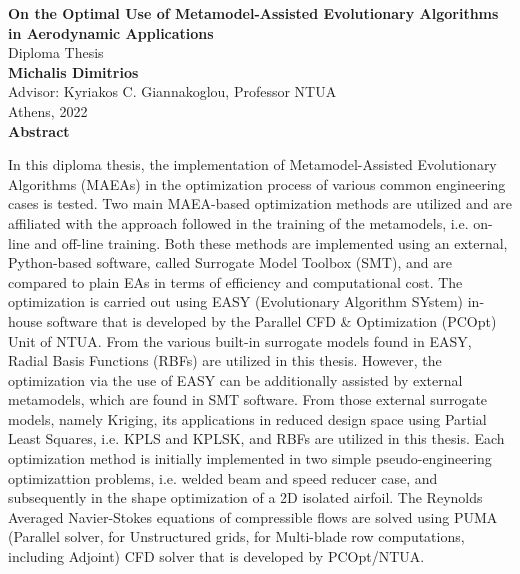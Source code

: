 \documentclass[twoside, 12pt,notitlepage]{report}
\begin{document}
\hspace{-2mm}
\begin{center}
\textbf{On the Optimal Use of Metamodel-Assisted 
Evolutionary Algorithms in Aerodynamic Applications} \\[2mm]
Diploma Thesis \\[1mm]
\textbf{Michalis Dimitrios} \\[3mm]
Advisor: Kyriakos C. Giannakoglou, Professor NTUA \\[1mm]
Athens, 2022 \\[6mm]
\large \textbf{Abstract} \\
\end{center}

\vspace{2mm}

In this diploma thesis, the implementation of Metamodel-Assisted 
Evolutionary Algorithms (MAEAs) in the optimization process of 
various common engineering cases is tested. Two main MAEA-based 
optimization methods are utilized and are affiliated with the 
approach followed in the training of the metamodels, i.e. on-line 
and off-line training. Both these methods are implemented using an 
external, Python-based software, called Surrogate Model Toolbox 
(SMT), and are compared to plain EAs in terms of efficiency and 
computational cost. The optimization is carried out using EASY 
(Evolutionary Algorithm SYstem) in-house software that is developed 
by the Parallel CFD \& Optimization (PCOpt) Unit of NTUA. From the 
various built-in surrogate models found in EASY, Radial Basis 
Functions (RBFs) are utilized in this thesis. However, the 
optimization via the use of EASY can be additionally assisted by 
external metamodels, which are found in SMT software. 
From those external surrogate models, namely Kriging, its 
applications in reduced design space using Partial Least Squares, 
i.e. KPLS and KPLSK, and RBFs are utilized in this thesis. Each 
optimization method is initially implemented in two simple 
pseudo-engineering optimizattion problems, i.e. welded beam and 
speed reducer case, and subsequently in the shape optimization of 
a 2D isolated airfoil. The Reynolds Averaged Navier-Stokes 
equations of compressible flows are solved using PUMA (Parallel 
solver, for Unstructured grids, for Multi-blade row computations, 
including Adjoint) CFD solver that is developed by PCOpt/NTUA. 

\newpage
\end{document}

